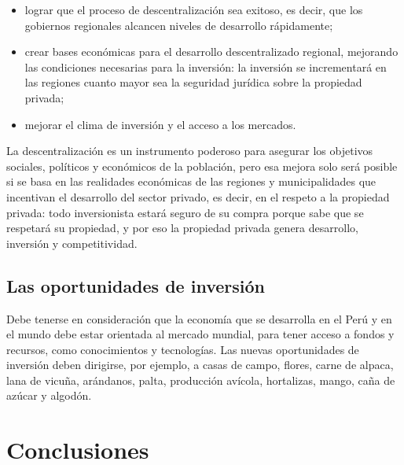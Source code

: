 \documentclass[
  man,
  floatsintext,
  longtable,
  a4paper,
  nolmodern,
  notxfonts,
  notimes,
  12pt,
  colorlinks=true,linkcolor=blue,citecolor=blue,urlcolor=blue]{apa7}
\providecommand{\tightlist}{%
  \setlength{\itemsep}{0pt}\setlength{\parskip}{0pt}}
\begin{document}
\begin{itemize}
\tightlist
\item
  lograr que el proceso de descentralización sea exitoso, es decir, que
  los gobiernos regionales alcancen niveles de desarrollo rápidamente;
\item
  crear bases económicas para el desarrollo descentralizado regional,
  mejorando las condiciones necesarias para la inversión: la inversión
  se incrementará en las regiones cuanto mayor sea la seguridad jurídica
  sobre la propiedad privada;
\item
  mejorar el clima de inversión y el acceso a los mercados.
\end{itemize}

La descentralización es un instrumento poderoso para asegurar los
objetivos sociales, políticos y económicos de la población, pero esa
mejora solo será posible si se basa en las realidades económicas de las
regiones y municipalidades que incentivan el desarrollo del sector
privado, es decir, en el respeto a la propiedad privada: todo
inversionista estará seguro de su compra porque sabe que se respetará su
propiedad, y por eso la propiedad privada genera desarrollo, inversión y
competitividad.

\subsection{Las oportunidades de
inversión}\label{las-oportunidades-de-inversiuxf3n}

Debe tenerse en consideración que la economía que se desarrolla en el
Perú y en el mundo debe estar orientada al mercado mundial, para tener
acceso a fondos y recursos, como conocimientos y tecnologías. Las nuevas
oportunidades de inversión deben dirigirse, por ejemplo, a casas de
campo, flores, carne de alpaca, lana de vicuña, arándanos, palta,
producción avícola, hortalizas, mango, caña de azúcar y algodón.

\section{Conclusiones}\label{conclusiones}
\end{document}
